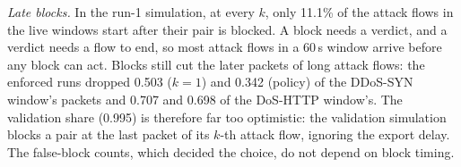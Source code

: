 \emph{Late blocks.} In the run-1 simulation, at every $k$, only 11.1\% of the attack flows in the live windows start after their pair is blocked. A block needs a verdict, and a verdict needs a flow to end, so most attack flows in a 60\,s window arrive before any block can act. Blocks still cut the later packets of long attack flows: the enforced runs dropped 0.503 ($k=1$) and 0.342 (policy) of the DDoS-SYN window's packets and 0.707 and 0.698 of the DoS-HTTP window's. The validation share (0.995) is therefore far too optimistic: the validation simulation blocks a pair at the last packet of its $k$-th attack flow, ignoring the export delay. The false-block counts, which decided the choice, do not depend on block timing.
